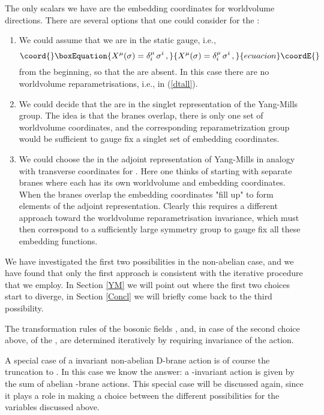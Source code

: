 \documentclass[12pt,a4paper]{article}
\begin{document}
The only scalars we have are  the embedding coordinates
\coordHE{} for worldvolume directions.
There are several options that one could consider for the \coordHE{}:
\begin{enumerate}
\item We could assume that we are in the static gauge, i.e.,
\begin{equation}\coord{}\boxEquation{
    X^\mu(\sigma) = \delta^\mu_i\,\sigma^i\,,
}{
    X^\mu(\sigma) = \delta^\mu_i\,\sigma^i\,,
}{ecuacion}\coordE{}\end{equation}
 from the
 beginning, so that the \coordHE{} are absent. In this case there are no
 worldvolume reparametrisations, i.e., \coordHE{} in (\ref{dtall}).
\item We could decide that the \coordHE{} are in the singlet representation
 of the Yang-Mills group. The idea is that the \coordHE{} branes overlap,
 there is only one set of worldvolume coordinates, and the corresponding
 reparametrization group would be sufficient to gauge fix a singlet
 set of embedding coordinates.
\item We could choose the \coordHE{} in the adjoint representation of
 Yang-Mills in analogy with transverse coordinates for \coordHE{}.
 Here one thinks of starting with \coordHE{} separate branes where each has its
 own worldvolume and embedding coordinates. When the branes overlap
 the embedding coordinates "fill up" to form elements of the adjoint
 representation.
 Clearly
 this requires a different approach toward the worldvolume
 reparametrisation invariance, which must then correspond to a sufficiently
 large symmetry group to gauge fix all these embedding functions.
\end{enumerate}
We have investigated the first two possibilities in the non-abelian case,
and we have found that only the first approach is consistent with the
iterative procedure that we employ. In Section \ref{YM} we will point out
where the first two choices start to diverge, in Section \ref{Concl}
we will briefly come back to the third possibility.

The transformation rules of the bosonic fields \coordHE{}, and, in case of
the second choice above, of the \coordHE{}, are determined iteratively
by requiring invariance of the action.

A special case of a \coordHE{} invariant non-abelian D-brane action is
of course the truncation to \coordHE{}. In this case we know the answer:
a \myHighlight{$\kappa$}\coordHE{}-invariant action is given by the sum of \coordHE{} abelian
\coordHE{}-brane actions. This special case will be discussed again, since it
plays a role in making a choice between the different
possibilities for the variables \coordHE{} discussed above.
\end{document}
